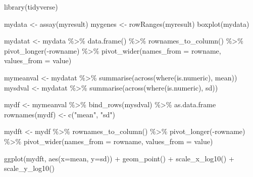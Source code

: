 \documentclass[
]{book}
\newenvironment{Shaded}{\begin{snugshade}}{\end{snugshade}}
\newcommand{\AttributeTok}[1]{\textcolor[rgb]{0.77,0.63,0.00}{#1}}
\newcommand{\FunctionTok}[1]{\textcolor[rgb]{0.00,0.00,0.00}{#1}}
\newcommand{\NormalTok}[1]{#1}
\newcommand{\OtherTok}[1]{\textcolor[rgb]{0.56,0.35,0.01}{#1}}
\newcommand{\SpecialCharTok}[1]{\textcolor[rgb]{0.00,0.00,0.00}{#1}}
\newcommand{\StringTok}[1]{\textcolor[rgb]{0.31,0.60,0.02}{#1}}
\begin{document}
\begin{Shaded}
\begin{Highlighting}[]
\FunctionTok{library}\NormalTok{(tidyverse)}

\NormalTok{mydata }\OtherTok{\textless{}{-}} \FunctionTok{assay}\NormalTok{(myresult)}
\NormalTok{mygenes }\OtherTok{\textless{}{-}} \FunctionTok{rowRanges}\NormalTok{(myresult)}
\FunctionTok{boxplot}\NormalTok{(mydata)}

\NormalTok{mydatat }\OtherTok{\textless{}{-}}\NormalTok{ mydata }\SpecialCharTok{\%\textgreater{}\%} 
  \FunctionTok{data.frame}\NormalTok{() }\SpecialCharTok{\%\textgreater{}\%} 
  \FunctionTok{rownames\_to\_column}\NormalTok{()  }\SpecialCharTok{\%\textgreater{}\%} 
  \FunctionTok{pivot\_longer}\NormalTok{(}\SpecialCharTok{{-}}\NormalTok{rowname) }\SpecialCharTok{\%\textgreater{}\%}
  \FunctionTok{pivot\_wider}\NormalTok{(}\AttributeTok{names\_from =}\NormalTok{ rowname, }\AttributeTok{values\_from =}\NormalTok{ value)}

\NormalTok{mymeanval }\OtherTok{\textless{}{-}}\NormalTok{ mydatat }\SpecialCharTok{\%\textgreater{}\%} 
  \FunctionTok{summarise}\NormalTok{(}\FunctionTok{across}\NormalTok{(}\FunctionTok{where}\NormalTok{(is.numeric), mean))}
\NormalTok{mysdval }\OtherTok{\textless{}{-}}\NormalTok{ mydatat }\SpecialCharTok{\%\textgreater{}\%} 
  \FunctionTok{summarise}\NormalTok{(}\FunctionTok{across}\NormalTok{(}\FunctionTok{where}\NormalTok{(is.numeric), sd))}

\NormalTok{mydf }\OtherTok{\textless{}{-}}\NormalTok{ mymeanval }\SpecialCharTok{\%\textgreater{}\%} 
  \FunctionTok{bind\_rows}\NormalTok{(mysdval) }\SpecialCharTok{\%\textgreater{}\%} 
\NormalTok{  as.data.frame}
\FunctionTok{rownames}\NormalTok{(mydf) }\OtherTok{\textless{}{-}} \FunctionTok{c}\NormalTok{(}\StringTok{"mean"}\NormalTok{, }\StringTok{"sd"}\NormalTok{)}

\NormalTok{mydft }\OtherTok{\textless{}{-}}\NormalTok{ mydf }\SpecialCharTok{\%\textgreater{}\%} 
  \FunctionTok{rownames\_to\_column}\NormalTok{() }\SpecialCharTok{\%\textgreater{}\%} 
  \FunctionTok{pivot\_longer}\NormalTok{(}\SpecialCharTok{{-}}\NormalTok{rowname) }\SpecialCharTok{\%\textgreater{}\%} 
  \FunctionTok{pivot\_wider}\NormalTok{(}\AttributeTok{names\_from =}\NormalTok{ rowname, }\AttributeTok{values\_from =}\NormalTok{ value)}

\FunctionTok{ggplot}\NormalTok{(mydft, }\FunctionTok{aes}\NormalTok{(}\AttributeTok{x=}\NormalTok{mean, }\AttributeTok{y=}\NormalTok{sd)) }\SpecialCharTok{+}
  \FunctionTok{geom\_point}\NormalTok{() }\SpecialCharTok{+}
  \FunctionTok{scale\_x\_log10}\NormalTok{() }\SpecialCharTok{+}
  \FunctionTok{scale\_y\_log10}\NormalTok{()}
  
\end{Highlighting}
\end{Shaded}
\end{document}
